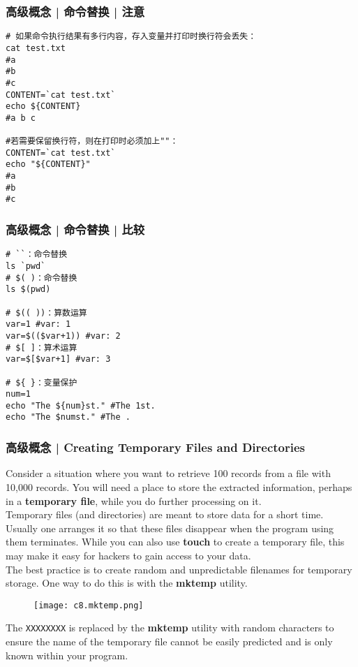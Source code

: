 \begin{frame}[fragile]
  \frametitle{高级概念 | 命令替换 | \alert{注意}}
\begin{lstlisting}
# 如果命令执行结果有多行内容，存入变量并打印时换行符会丢失：
cat test.txt
#a
#b
#c
CONTENT=`cat test.txt`
echo ${CONTENT}
#a b c

#若需要保留换行符，则在打印时必须加上""：
CONTENT=`cat test.txt`
echo "${CONTENT}"      
#a
#b
#c
\end{lstlisting}
\end{frame}

\begin{frame}[fragile]
  \frametitle{高级概念 | 命令替换 | \alert{比较}}
\begin{lstlisting}
# ``：命令替换
ls `pwd`
# $( )：命令替换
ls $(pwd)

# $(( ))：算数运算
var=1 #var: 1
var=$(($var+1)) #var: 2
# $[ ]：算术运算
var=$[$var+1] #var: 3

# ${ }：变量保护
num=1
echo "The ${num}st." #The 1st.
echo "The $numst." #The .
\end{lstlisting}
\end{frame}

\begin{frame}[fragile]
  \frametitle{高级概念 | Creating Temporary Files and Directories}
  {\footnotesize
  Consider a situation where you want to retrieve 100 records from a file with 10,000 records. You will need a place to store the extracted information, perhaps in a \textbf{temporary file}, while you do further processing on it.\\
  \vspace{0.1cm}
  Temporary files (and directories) are meant to store data for a short time. Usually one arranges it so that these files disappear when the program using them terminates. While you can also use \textbf{touch} to create a temporary file, this may make it easy for hackers to gain access to your data.\\
  \vspace{0.1cm}
  The best practice is to create random and unpredictable filenames for temporary storage. One way to do this is with the \textbf{mktemp} utility.
  \vspace{-0.3cm}
  \begin{figure}
    \centering
    \texttt{[image: c8.mktemp.png]}
  \end{figure}
  \vspace{-0.3cm}
  The \verb|XXXXXXXX| is replaced by the \textbf{mktemp} utility with random characters to ensure the name of the temporary file cannot be easily predicted and is only known within your program.
  }
\end{frame}

